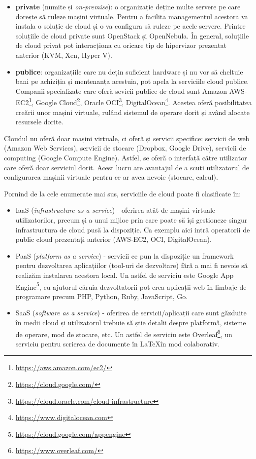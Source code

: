 \begin{itemize}
  \item \textbf{private} (numite și \textit{on-premise}): o organizație deține multe servere pe care dorește să
		ruleze mașini virtuale. Pentru a facilita managementul acestora
		va instala o soluție de cloud și o va configura să ruleze pe
		acele servere. Printre soluțiile de cloud private sunt OpenStack și OpenNebula. În
		general, soluțiile de cloud privat pot interacționa cu oricare
		tip de hipervizor prezentat anterior (KVM, Xen, Hyper-V).
              \item \textbf{publice}: organizațiile care nu dețin suficient hardware și nu vor
		să cheltuie bani pe achiziția și mentenanța acestuia,
		pot apela la serviciile cloud publice. Companii specializate
                care oferă sevicii publice de cloud sunt Amazon AWS-EC2\footnote{\url{https://aws.amazon.com/ec2/}}, Google
                Cloud\footnote{\url{https://cloud.google.com/}}, Oracle
		OCI\footnote{\url{https://cloud.oracle.com/cloud-infrastructure}},
		DigitalOcean\footnote{\url{https://www.digitalocean.com}}.
		Acestea oferă posibilitatea creării unor mașini virtuale, rulând
		sistemul de operare dorit și având alocate resursele dorite.
\end{itemize}

Cloudul nu oferă doar mașini virtuale, ci oferă și servicii specifice: servicii
de web (Amazon Web Services), servicii de stocare (Dropbox, Google Drive),
servicii de computing (Google Compute Engine). Astfel, se oferă o interfață
către utilizator care oferă doar serviciul dorit. Acest lucru are avantajul de a
scuti utilizatorul de configurarea mașinii virtuale pentru ce ar avea
nevoie (stocare, calcul).

Pornind de la cele enumerate mai sus, serviciile de cloud poate fi clasificate în:

\begin{itemize}
  \item IaaS (\textit{infrastructure as a service}) - oferirea atât de mașini
		virtuale utilizatorilor, precum și a unui mijloc prin care poate
		să își gestioneze singur infrastructura de cloud pusă la
		dispoziție. Ca exemplu aici intră operatorii de public cloud
		prezentați anterior (AWS-EC2, OCI, DigitalOcean).
  \item PaaS (\textit{platform as a service}) - servicii ce pun la dispoziție un
		framework pentru dezvoltarea aplicațiilor (tool-uri de
		dezvoltare) fără a mai fi nevoie să realizăm instalarea acestora
                local. Un astfel de serviciu este Google App Engine\footnote{\url{https://cloud.google.com/appengine}}, cu ajutorul căruia dezvoltatorii pot crea aplicații web în limbaje de programare precum PHP, Python, Ruby, JavaScript, Go.
  \item SaaS (\textit{software as a service}) - oferirea de servicii/aplicații care
		sunt găzduite în medii cloud și utilizatorul trebuie să știe
		detalii despre platformă, sisteme de operare, mod de stocare,
                etc. Un astfel de serviciu este Overleaf\footnote{\url{https://www.overleaf.com/}}, un serviciu pentru scrierea de documente în \LaTeX  în mod colaborativ.
\end{itemize}

